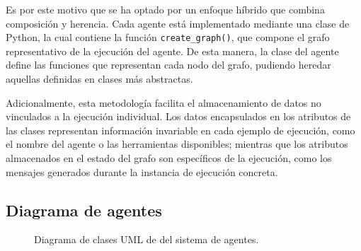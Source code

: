 Es por este motivo que se ha optado por un enfoque híbrido que combina composición y herencia. Cada agente está implementado mediante una clase de Python, la cual contiene la función \texttt{create\_graph()}, que compone el grafo representativo de la ejecución del agente. De esta manera, la clase del agente define las funciones que representan cada nodo del grafo, pudiendo heredar aquellas definidas en clases más abstractas.

Adicionalmente, esta metodología facilita el almacenamiento de datos no vinculados a la ejecución individual. Los datos encapsulados en los atributos de las clases representan información invariable en cada ejemplo de ejecución, como el nombre del agente o las herramientas disponibles; mientras que los atributos almacenados en el estado del grafo son específicos de la ejecución, como los mensajes generados durante la instancia de ejecución concreta.

\subsection{Diagrama de agentes}

\begin{figure}[p]
  \centering
  \caption{Diagrama de clases UML de del sistema de agentes.}
  \label{fig:uml}
\end{figure}

